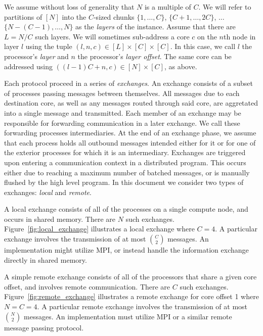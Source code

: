 \documentclass[10]{report}
\begin{document}
We assume without loss of generality that $N$ is a multiple of $C$. 
We will refer to partitions of $[N]$ into the $C$-sized chunks $\{1, \dots, C\}$, $\{C+1, \dots, 2C\}$, $\dots$ $\{N-(C-1), \dots, N\}$ as the \emph{layers} of the instance.
Assume that there are $L = N/C$ such layers.
We will sometimes sub-address a core $c$ on the $n$th node in layer $l$ using the tuple $(l, n, c) \in [L] \times [C] \times [C]$.
In this case, we call $l$ the processor's \emph{layer} and $n$ the processor's \emph{layer offset}. 
The same core can be addressed using $((l-1)C + n, c) \in [N] \times [C]$, as above.

Each protocol proceed in a series of \emph{exchanges}.
An exchange consists of a subset of processes passing messages between themselves.
All messages due to each destination core, as well as any messages routed through said core, are aggretated into a single message and transmitted.
Each member of an exchange may be responsible for forwarding communication in a later exchange.
We call these forwarding processes intermediaries.
At the end of an exchange phase, we assume that each process holds all outbound messages intended either for it or for one of the exterior processes for which it is an intermediary.
Exchanges are triggered upon entering a communication context in a distributed program.
This occurs either due to reaching a maximum number of batched messages, or is manually flushed by the high level program.
In this document we consider two types of exchanges: \emph{local} and \emph{remote}.

A local exchange consists of all of the processes on a single compute node, and occurs in shared memory. 
There are $N$ such exchanges.
Figure~\ref{fig:local_exchange} illustrates a local exchange where $C=4$.
A particular exchange involves the transmission of at most ${C \choose 2}$ messages.
An implementation might utilize MPI, or instead handle the information exchange directly in shared memory.

A simple remote exchange consists of all of the processors that share a given core offset, and involves remote communication.
There are $C$ such exchanges.
Figure~\ref{fig:remote_exchange} illustrates a remote exchange for core offset 1 where $N = C = 4$.
A particular remote exchange involves the transmission of at most ${N \choose 2}$ messages.
An implementation must utilize MPI or a similar remote message passing protocol.

\end{document}
